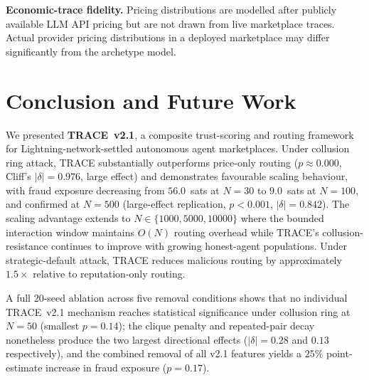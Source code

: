 \documentclass[sigconf,nonacm,10pt]{acmart}
\begin{document}
\noindent\textbf{Economic-trace fidelity.}
Pricing distributions are modelled after publicly available LLM
API pricing but are not drawn from live marketplace traces. Actual
provider pricing distributions in a deployed marketplace may
differ significantly from the archetype model.

\section{Conclusion and Future Work}
\label{sec:conclusion}

We presented \textbf{TRACE~v2.1}, a composite trust-scoring and
routing framework for Lightning-network-settled autonomous agent
marketplaces. Under collusion ring attack, TRACE substantially
outperforms price-only routing ($p \approx 0.000$, Cliff's
$|\delta| = 0.976$, large effect) and demonstrates favourable
scaling behaviour, with fraud exposure decreasing from
$56.0$~sats at $N{=}30$ to $9.0$~sats at $N{=}100$, and
confirmed at $N{=}500$ (large-effect replication,
$p < 0.001$, $|\delta| = 0.842$). The scaling advantage
extends to $N \in \{1000, 5000, 10000\}$ where the bounded
interaction window maintains $O(N)$ routing overhead while
TRACE's collusion-resistance continues to improve with growing
honest-agent populations. Under strategic-default attack, TRACE
reduces malicious routing by approximately $1.5\times$ relative
to reputation-only routing.

A full 20-seed ablation across five removal conditions shows
that no individual TRACE~v2.1 mechanism reaches statistical
significance under collusion ring at $N{=}50$ (smallest
$p = 0.14$); the clique penalty and repeated-pair decay
nonetheless produce the two largest directional effects
($|\delta| = 0.28$ and $0.13$ respectively), and the combined
removal of all v2.1 features yields a $25\%$ point-estimate
increase in fraud exposure ($p = 0.17$).
\end{document}
